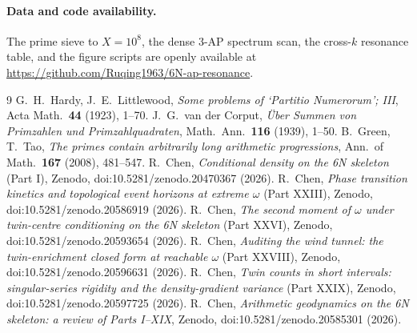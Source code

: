 \documentclass[11pt]{article}
\theoremstyle{definition}
\begin{document}
\paragraph{Data and code availability.} The prime sieve to $X=10^{8}$, the dense $3$-AP spectrum scan,
the cross-$k$ resonance table, and the figure scripts are openly available at
\url{https://github.com/Ruqing1963/6N-ap-resonance}.

\begin{thebibliography}{9}
 G.~H.~Hardy, J.~E.~Littlewood, \emph{Some problems of `Partitio Numerorum'; III}, Acta Math.\ \textbf{44} (1923), 1--70.
 J.~G.~van der Corput, \emph{\"Uber Summen von Primzahlen und Primzahlquadraten}, Math.\ Ann.\ \textbf{116} (1939), 1--50.
 B.~Green, T.~Tao, \emph{The primes contain arbitrarily long arithmetic progressions}, Ann.\ of Math.\ \textbf{167} (2008), 481--547.
 R.~Chen, \emph{Conditional density on the 6N skeleton} (Part I), Zenodo, doi:10.5281/zenodo.20470367 (2026).
 R.~Chen, \emph{Phase transition kinetics and topological event horizons at extreme $\omega$} (Part XXIII), Zenodo, doi:10.5281/zenodo.20586919 (2026).
 R.~Chen, \emph{The second moment of $\omega$ under twin-centre conditioning on the 6N skeleton} (Part XXVI), Zenodo, doi:10.5281/zenodo.20593654 (2026).
 R.~Chen, \emph{Auditing the wind tunnel: the twin-enrichment closed form at reachable $\omega$} (Part XXVIII), Zenodo, doi:10.5281/zenodo.20596631 (2026).
 R.~Chen, \emph{Twin counts in short intervals: singular-series rigidity and the density-gradient variance} (Part XXIX), Zenodo, doi:10.5281/zenodo.20597725 (2026).
 R.~Chen, \emph{Arithmetic geodynamics on the 6N skeleton: a review of Parts I--XIX}, Zenodo, doi:10.5281/zenodo.20585301 (2026).
\end{thebibliography}
\end{document}
